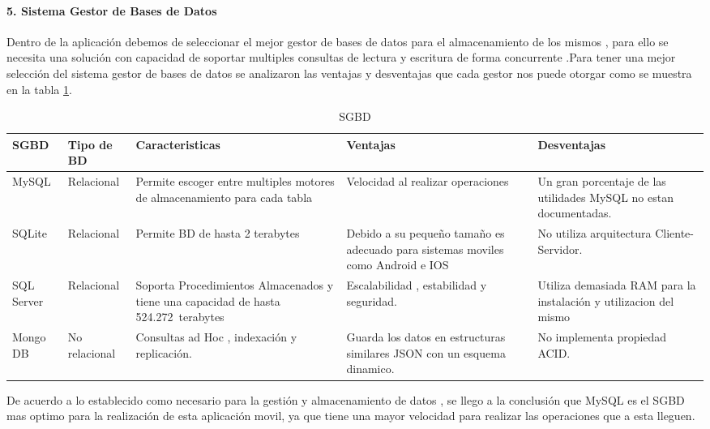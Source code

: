\paragraph{5. Sistema Gestor de Bases de Datos} 
Dentro de la aplicación debemos de seleccionar el mejor gestor de bases de datos para el almacenamiento de los mismos , para ello se necesita una solución con capacidad de soportar multiples consultas de lectura y escritura de forma concurrente .Para tener una mejor selección del sistema gestor de bases de datos se analizaron las ventajas y desventajas que cada gestor nos puede otorgar como se muestra en la tabla \ref{disenoEstructura:SGBD}.
\begin{table}[h!]
\begin{tabular}{|p{3cm}|p{3.5cm}|p{3cm}|p{3cm}|p{3cm}|}
\hline
\textbf{SGBD}&\textbf{Tipo de BD}& \textbf{Caracteristicas}& \textbf{Ventajas} & \textbf{Desventajas} \\
\hline
\hline
MySQL & Relacional & Permite escoger entre multiples motores de almacenamiento para cada tabla & Velocidad al realizar operaciones & Un gran porcentaje de las utilidades MySQL no estan documentadas. \\
\hline
\hline
SQLite & Relacional & Permite BD de hasta 2 terabytes & Debido a su pequeño tamaño es adecuado para sistemas moviles como Android e IOS & No utiliza arquitectura Cliente-Servidor. \\
\hline
\hline
SQL Server & Relacional & Soporta Procedimientos Almacenados y tiene una capacidad de hasta 524.272 terabytes & Escalabilidad , estabilidad y seguridad. & Utiliza demasiada RAM para la instalación y utilizacion del mismo \\
\hline
\hline
Mongo DB & No relacional & Consultas ad Hoc , indexación y replicación. &Guarda los datos en estructuras similares JSON con un esquema dinamico.& No implementa propiedad ACID. \\
\hline

\end{tabular}
\caption{SGBD}
\label{disenoEstructura:SGBD}
\end{table}

De acuerdo a lo establecido como necesario para la gestión y almacenamiento de datos , se llego a la conclusión que MySQL es el SGBD mas optimo para la realización de esta aplicación movil, ya que tiene una mayor velocidad para realizar las operaciones que a esta lleguen. 




